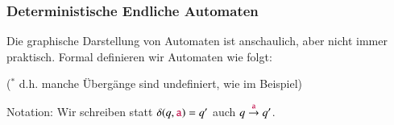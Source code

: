 \documentclass[aspectratio=1610,onlymath]{beamer}
\begin{document}
\begin{frame}\frametitle{Deterministische Endliche Automaten}

Die graphische Darstellung von Automaten ist anschaulich, aber nicht immer praktisch.
Formal definieren wir Automaten wie folgt:\bigskip

{\footnotesize (\alert{$^*$} d.h. manche Übergänge sind undefiniert, wie im Beispiel)}
\medskip

\alert{Notation:} Wir schreiben statt $\delta(q,\mathtt{\textcolor{purple}{a}})=q'$ auch $q\stackrel{\mathtt{\textcolor{purple}{a}}}{\to}q'$.

% 

\end{frame}
\end{document}
